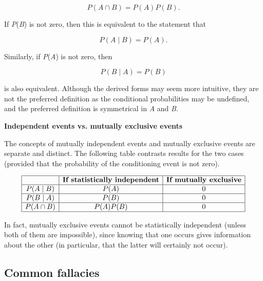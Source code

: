 $$P(A \cap B) = P(A) P(B).$$



If \textit{P}(\textit{B}) is not zero, then this is equivalent to the statement that



$$P(A\mid B) = P(A).$$



Similarly, if \textit{P}(\textit{A}) is not zero, then



$$P(B\mid A) = P(B)$$



is also equivalent. Although the derived forms may seem more intuitive, they are not the
preferred definition as the conditional probabilities may be undefined, and the preferred
definition is symmetrical in \textit{A} and \textit{B}.



\textbf{Independent events vs. mutually exclusive events}



The concepts of mutually independent events and mutually exclusive events are separate and
distinct. The following table contrasts results for the two cases (provided that the
probability of the conditioning event is not zero).



$$ \begin{array}{|c|c|c|} \hline  & \textbf{If statistically independent} & \textbf{If mutually exclusive} \\ \hline P(A \mid B) & P(A) & 0 \\ \hline P(B \mid A) & P(B) & 0 \\ \hline P(A \cap B) & P(A)P(B) & 0 \\ \hline \end{array} $$



In fact, mutually exclusive events cannot be statistically independent (unless both of
them are impossible), since knowing that one occurs gives information about the other (in
particular, that the latter will certainly not occur).




\subsection{Common fallacies}
\label{sss:comm-e170}




